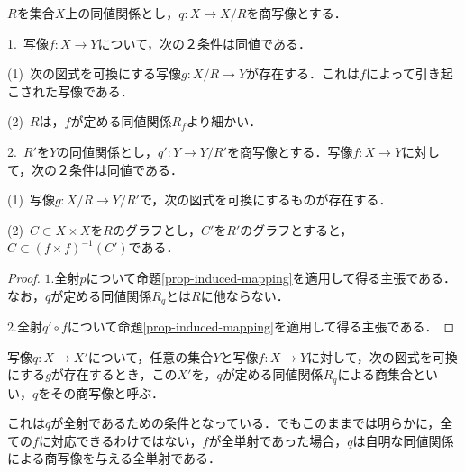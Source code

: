 \documentclass[uplatex, 12pt, dvipdfmx]{jsreport}
\begin{document}
\begin{corollary}[商集合の普遍性]
    $R$を集合$X$上の同値関係とし，$q:X\to X/R$を商写像とする．\rm{}
    
    1.\, 写像$f:X\to Y$について，次の２条件は同値である．

    (1)\, 次の図式を可換にする写像$g:X/R\to Y$が存在する．これは$f$によって引き起こされた写像である．
    \begin{center}\end{center}

    (2)\, $R$は，$f$が定める同値関係$R_f$より細かい．

    2.\, $R'$を$Y$の同値関係とし，$q':Y\to Y/R'$を商写像とする．写像$f:X\to Y$に対して，次の２条件は同値である．

    (1)\, 写像$g:X/R\to Y/R'$で，次の図式を可換にするものが存在する．
    \begin{center}\end{center}

    (2)\, $C\subset X\times X$を$R$のグラフとし，$C'$を$R'$のグラフとすると，$C\subset (f\times f)^{-1}(C')$である．
\end{corollary}
\begin{proof}
    $1.$全射$p$について命題\ref{prop-induced-mapping}を適用して得る主張である．なお，$q$が定める同値関係$R_q$とは$R$に他ならない．
    
    $2.$全射$q'\circ f$について命題\ref{prop-induced-mapping}を適用して得る主張である．
\end{proof}

\begin{definition}
    写像$q:X\to X'$について，任意の集合$Y$と写像$f:X\to Y$に対して，次の図式を可換にする$g$が存在するとき，この$X'$を，$q$が定める同値関係$R_q$による商集合といい，$q$をその商写像と呼ぶ．
    \begin{center}\end{center}
\end{definition}
\begin{remark}
    これは$q$が全射であるための条件となっている．でもこのままでは明らかに，全ての$f$に対応できるわけではない，$f$が全単射であった場合，$q$は自明な同値関係による商写像を与える全単射である．
\end{remark}
\end{document}
